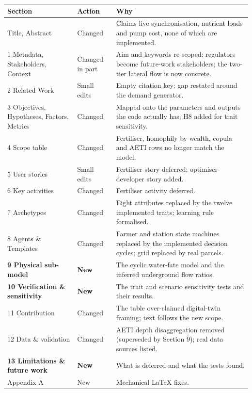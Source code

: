 \documentclass{article}
\begin{document}
\begin{added}
\medskip
\small
\begin{tabular}{p{4.1cm}p{1.7cm}p{10.4cm}}
\toprule
\textbf{Section} & \textbf{Action} & \textbf{Why} \\ \midrule
Title, Abstract & Changed & Claims live synchronisation, nutrient loads and pump cost, none of which are implemented. \\
1 Metadata, Stakeholders, Context & Changed in part & Aim and keywords re-scoped; regulators become future-work stakeholders; the two-tier lateral flow is now concrete. \\
2 Related Work & Small edits & Empty citation key; gap restated around the demand generator. \\
3 Objectives, Hypotheses, Factors, Metrics & Changed & Mapped onto the parameters and outputs the code actually has; H8 added for trait sensitivity. \\
4 Scope table & Changed & Fertiliser, homophily by wealth, copula and AETI rows no longer match the model. \\
5 User stories & Small edits & Fertiliser story deferred; optimiser-developer story added. \\
6 Key activities & Changed & Fertiliser activity deferred. \\
7 Archetypes & Changed & Eight attributes replaced by the twelve implemented traits; learning rule formalised. \\
8 Agents \& Templates & Changed & Farmer and station state machines replaced by the implemented decision cycles; grid replaced by real parcels. \\
\textbf{9 Physical sub-model} & \textbf{New} & The cyclic water-fate model and the inferred underground flow ratios. \\
\textbf{10 Verification \& sensitivity} & \textbf{New} & The trait and scenario sensitivity tests and their results. \\
11 Contribution & Changed & The table over-claimed digital-twin framing; text follows the new scope. \\
12 Data \& validation & Changed & AETI depth disaggregation removed (superseded by Section 9); real data sources listed. \\
\textbf{13 Limitations \& future work} & \textbf{New} & What is deferred and what the tests found. \\
Appendix A & New & Mechanical LaTeX fixes. \\ \bottomrule
\end{tabular}
\end{added}
\end{document}
